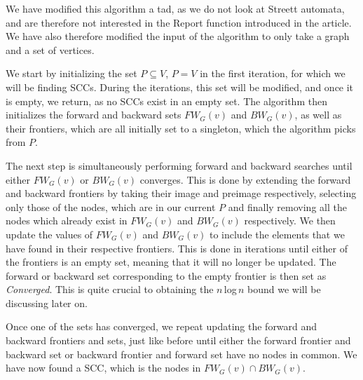 \documentclass[../master/master.tex]{subfiles}
\newcommand{\FW}[2][G]{\ensuremath{FW_{#1}(#2)}}
\newcommand{\BW}[2][G]{\ensuremath{BW_{#1}(#2)}}
\begin{document}
We have modified this algorithm a tad, as we do not look at Streett automata, and are therefore not interested in the Report function introduced in the article. We have also therefore modified the input of the algorithm to only take a graph and a set of vertices. 

We start by initializing the set $P\subseteq V$, $P=V$ in the first iteration, for which we will be finding SCCs. During the iterations, this set will be modified, and once it is empty, we return, as no SCCs exist in an empty set. The algorithm then initializes the forward and backward sets \FW{v} and \BW{v}, as well as their frontiers, which are all initially set to a singleton, which the algorithm picks from $P$.

The next step is simultaneously performing forward and backward searches until either \FW{v} or \BW{v} converges. This is done by extending the forward and backward frontiers by taking their image and preimage respectively, selecting only those of the nodes, which are in our current $P$ and finally removing all the nodes which already exist in \FW{v} and \BW{v} respectively. We then update the values of \FW{v} and \BW{v} to include the elements that we have found in their respective frontiers. This is done in iterations until either of the frontiers is an empty set, meaning that it will no longer be updated. The forward or backward set corresponding to the empty frontier is then set as \emph{Converged}. This is quite crucial to obtaining the $n$\,log\,$n$ bound we will be discussing later on.

Once one of the sets has converged, we repeat updating the forward and backward frontiers and sets, just like before until either the forward frontier and backward set or backward frontier and forward set have no nodes in common. 
We have now found a SCC, which is the nodes in $\FW{v}\cap\BW{v}$. 
\end{document}
